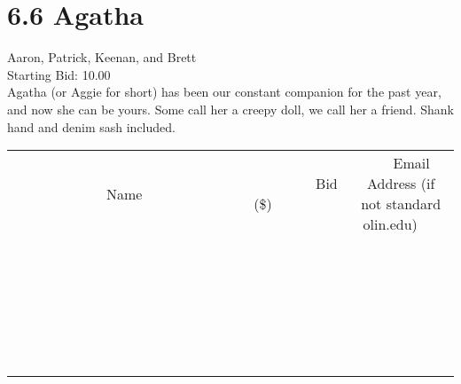 \documentclass[11pt]{article}
\begin{document}
					\section*{6.6 Agatha}
					Aaron, Patrick, Keenan, and Brett \\
					Starting Bid: 10.00 \\
					Agatha (or Aggie for short) has been our constant companion for the past year, and now she can be yours. Some call her a creepy doll, we call her a friend. Shank hand and denim sash included. \\
					[6ex]
					\begin{tabular}{c c c}
						~~~~~~~~~~~~~Name~~~~~~~~~~~~~ & ~~~~~~~~~Bid (\$)~~~~~~~~~ & ~~~Email Address (if not standard olin.edu)~~~ \\
				
 & & \\
\hline
 & & \\
\hline
 & & \\
\hline
 & & \\
\hline
 & & \\
\hline
 & & \\
\hline
 & & \\
\hline
 & & \\
\hline
 & & \\
\hline
 & & \\
\hline
 & & \\
\hline
 & & \\
\hline
 & & \\
\hline
 & & \\
\hline
 & & \\
\hline
 & & \\
\hline
 & & \\
\hline
 & & \\
\hline
 & & \\
\hline
 & & \\
\hline
 & & \\
\hline
 & & \\
\hline
 & & \\
\hline
 & & \\
\hline
 & & \\
\hline
 & & \\
\hline
					\end{tabular}
					\clearpage
				
\end{document}
